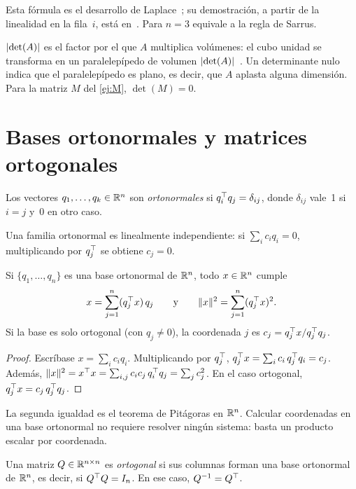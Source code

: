Esta fórmula es el desarrollo de Laplace~\cite[teorema~4.2]{mml}; su demostración, a partir de la linealidad en la fila~$i$, está en~\cite[§5.2]{strang-ila}. Para $n=3$ equivale a la regla de Sarrus.

\begin{observacion}
$\lvert\det(A)\rvert$ es el factor por el que $A$ multiplica volúmenes: el cubo unidad se transforma en un paralelepípedo de volumen $\lvert\det(A)\rvert$~\cite[§5.3]{strang-ila}. Un determinante nulo indica que el paralelepípedo es plano, es decir, que $A$ aplasta alguna dimensión. Para la matriz $M$ del \cref{ej:M}, $\det(M)=0$.
\end{observacion}

\section{Bases ortonormales y matrices ortogonales}\label{sec:ortogonales}

\begin{definicion}
Los vectores $q_1,\dots,q_k\in\mathbb{R}^{n}$ son \emph{ortonormales} si $q_i^{\top} q_j=\delta_{ij}$, donde $\delta_{ij}$ vale~1 si $i=j$ y~0 en otro caso.
\end{definicion}

Una familia ortonormal es linealmente independiente: si $\sum_i c_iq_i=0$, multiplicando por $q_j^{\top}$ se obtiene $c_j=0$.

\begin{proposicion}\label{prop:coord-ortonormal}
Si $\{q_1,\dots,q_n\}$ es una base ortonormal de $\mathbb{R}^{n}$, todo $x\in\mathbb{R}^{n}$ cumple
\[
x=\sum_{j=1}^{n}(q_j^{\top} x)\,q_j\qquad\text{y}\qquad \lVert x\rVert^{2}=\sum_{j=1}^{n}(q_j^{\top} x)^{2}.
\]
Si la base es solo ortogonal (con $q_j\ne 0$), la coordenada $j$ es $c_j=q_j^{\top} x/q_j^{\top} q_j$.
\end{proposicion}

\begin{proof}
Escríbase $x=\sum_i c_iq_i$. Multiplicando por $q_j^{\top}$, $q_j^{\top} x=\sum_i c_i\,q_j^{\top} q_i=c_j$. Además, $\lVert x\rVert^{2}=x^{\top} x=\sum_{i,j}c_ic_j\,q_i^{\top} q_j=\sum_j c_j^{2}$. En el caso ortogonal, $q_j^{\top} x=c_j\,q_j^{\top} q_j$.
\end{proof}

La segunda igualdad es el teorema de Pitágoras en $\mathbb{R}^{n}$. Calcular coordenadas en una base ortonormal no requiere resolver ningún sistema: basta un producto escalar por coordenada.

\begin{definicion}
Una matriz $Q\in\mathbb{R}^{n\times n}$ es \emph{ortogonal} si sus columnas forman una base ortonormal de $\mathbb{R}^{n}$, es decir, si $Q^{\top} Q=I_n$. En ese caso, $Q^{-1}=Q^{\top}$.
\end{definicion}

